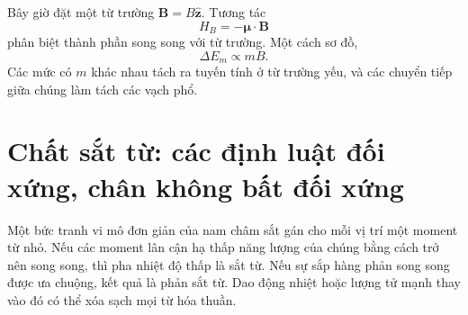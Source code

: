 \begin{classroomqa}
\end{classroomqa}

Bây giờ đặt một từ trường \(\mathbf B=B\hat{\mathbf z}\). Tương tác
\begin{equation}
H_B=-\boldsymbol{\mu}\cdot\mathbf B
\end{equation}
phân biệt thành phần song song với từ trường. Một cách sơ đồ,
\begin{equation}
\Delta E_m\propto mB.
\label{eq:l9-zeeman}
\end{equation}
Các mức có \(m\) khác nhau tách ra tuyến tính ở từ trường yếu, và các chuyển tiếp giữa chúng làm tách các vạch phổ.

\begin{classroomqa}
\end{classroomqa}

\begin{center}
\end{center}

\section{Chất sắt từ: các định luật đối xứng, chân không bất đối xứng}

Một bức tranh vi mô đơn giản của nam châm sắt gán cho mỗi vị trí một moment từ nhỏ. Nếu các moment lân cận hạ thấp năng lượng của chúng bằng cách trở nên song song, thì pha nhiệt độ thấp là sắt từ. Nếu sự sắp hàng phản song song được ưa chuộng, kết quả là phản sắt từ. Dao động nhiệt hoặc lượng tử mạnh thay vào đó có thể xóa sạch mọi từ hóa thuần.


